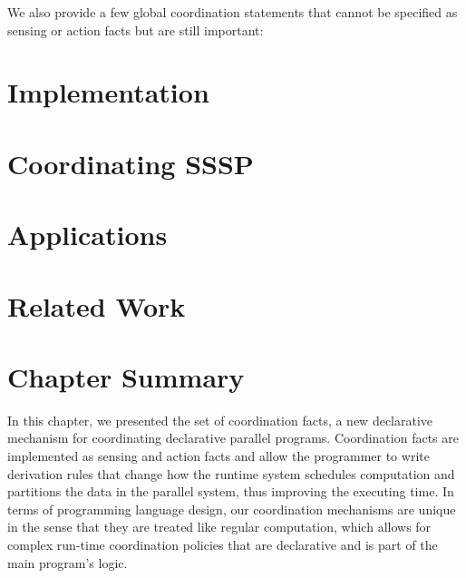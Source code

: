 We also provide a few global coordination statements that cannot be specified
as sensing or action facts but are still important:


\section{Implementation}


\section{Coordinating SSSP}


\section{Applications}



\section{Related Work}\label{sec:coordination:related}


\section{Chapter Summary}

In this chapter, we presented the set of coordination facts, a new declarative
mechanism for coordinating declarative parallel programs. Coordination facts are
implemented as sensing and action facts and allow the programmer to write
derivation rules that change how the runtime system schedules computation and
partitions the data in the parallel system, thus improving the executing time.
In terms of programming language design, our coordination mechanisms are unique
in the sense that they are treated like regular computation, which allows for
complex run-time coordination policies that are declarative and is part of the
main program's logic.
